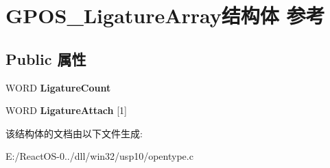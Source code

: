 \hypertarget{struct_g_p_o_s___ligature_array}{}\section{G\+P\+O\+S\+\_\+\+Ligature\+Array结构体 参考}
\label{struct_g_p_o_s___ligature_array}
\subsection*{Public 属性}
\begin{DoxyCompactItemize}
\item 
\mbox{\label{struct_g_p_o_s___ligature_array_a8846f3a563af4db08d5b1160f8671459}} 
W\+O\+RD {\bfseries Ligature\+Count}
\item 
\mbox{\label{struct_g_p_o_s___ligature_array_a29a5da37ced04a47069764dc7e55eaa7}} 
W\+O\+RD {\bfseries Ligature\+Attach} \mbox{[}1\mbox{]}
\end{DoxyCompactItemize}


该结构体的文档由以下文件生成\+:\begin{DoxyCompactItemize}
\item 
E\+:/\+React\+O\+S-\/0../dll/win32/usp10/opentype.\+c\end{DoxyCompactItemize}
